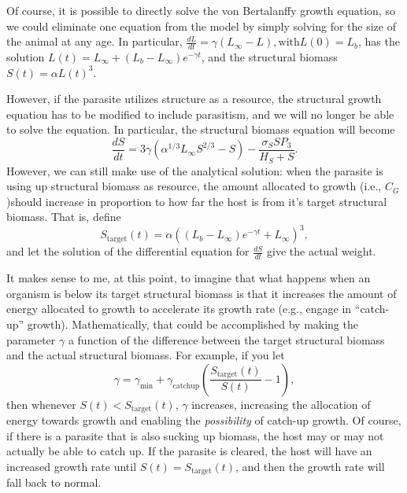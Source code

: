 \documentclass[11pt,reqno,final,pdftex]{amsart}\usepackage[]{graphicx}\usepackage[]{color}
\theoremstyle{plain}
\numberwithin{equation}{part}
\begin{document}
Of course, it is possible to directly solve the von Bertalanffy growth equation, so we could eliminate one equation from the model by simply solving for the size of the animal at any age.
In particular, $\frac{dL}{dt}=\gamma \left(L_{\infty }-L\right), \text{with} L(0)=L_b$, has the solution $L(t)=L_{\infty }+\left(L_b-L_{\infty}\right)e^{-\gamma t}$, and the structural biomass $S(t)=\alpha L(t)^3$.

However, if the parasite utilizes structure as a resource, the structural growth equation has to be modified to include parasitism, and we will no longer be able to solve the equation.
In particular, the structural biomass equation will become
\begin{equation}
\frac{dS}{dt}=3\gamma  \left(\alpha^{1/3}L_{\infty }S^{2/3}-S\right)-\frac{\sigma_S S P_3}{H_S+S}.
\end{equation}
However, we can still make use of the analytical solution: when the parasite is using up structural biomass as resource, the amount allocated to growth (i.e., $C_G$)should increase in proportion to how far the host is from it's target structural biomass.
That is, define
\begin{equation}
S_{\text{target}}(t)=\alpha \left(\left(L_b-L_{\infty }\right) e^{-\gamma  t}+L_{\infty }\right)^3,
\end{equation} and let the solution of the differential equation for $\frac{dS}{dt}$ give the actual weight.

It makes sense to me, at this point, to imagine that what happens when an organism is below its target structural biomass is that it increases the amount of energy allocated to growth to accelerate its growth rate (e.g., engage in ``catch-up'' growth).
Mathematically, that could be accomplished by making the parameter $\gamma$ a function of the difference between the target structural biomass and the actual structural biomass.
For example, if you let
\begin{equation}
\gamma =\gamma _{\min }+\gamma _{\text{catchup}}\left(\frac{S_{\text{target}}(t)}{S(t)}-1\right),
\end{equation}
then whenever $S(t)<S_{\text{target}}(t)$, $\gamma$ increases, increasing the allocation of energy towards growth and enabling the \textit{possibility} of catch-up growth.
Of course, if there is a parasite that is also sucking up biomass, the host may or may not actually be able to catch up.
If the parasite is cleared, the host will have an increased growth rate until $S(t)=S_{\text{target}}(t)$, and then the growth rate will fall back to normal.
\end{document}
